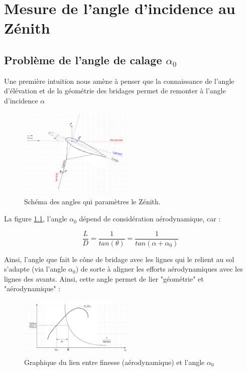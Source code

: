 \chapter{Mesure de l'angle d'incidence au Zénith}
\label{ch:Ch2}

\section{Problème de l'angle de calage $\alpha_0$} 
\label{sec:Ch2.1}

Une première intuition nous amène à penser que la connaissance de l'angle d'élévation et de la géométrie des bridages permet de remonter à l'angle d'incidence $\alpha$

\begin{figure}[H]
    \centering
    \includegraphics[width=0.5\textwidth]{Pics/02 - Mesure de l'angle d'incidence au Zénith/Schéma Equilibre Zéntih.png}  
    \caption{Schéma des angles qui paramètres le Zénith.}
    \label{fig:Zénith alpha zéro}
\end{figure}

La figure \ref{fig:Zénith alpha zéro}, l'angle $\alpha_0$ dépend de considération aérodynamique, car : 
\begin{center}
    \begin{equation}
        \frac{L}{D} = \frac{1}{tan(\theta)} = \frac{1}{tan(\alpha + \alpha_0)}
    \end{equation}
\end{center}
Ainsi, l'angle que fait le cône de bridage avec les lignes qui le relient au sol s'adapte (via l'angle $\alpha_0$) de sorte à aligner les efforts aérodynamiques avec les lignes des avants. Ainsi, cette angle permet de lier "géométrie" et "aérodynamique" :  

\begin{figure}[H]
    \centering
    \includegraphics[width=0.5\textwidth]{Pics/02 - Mesure de l'angle d'incidence au Zénith/Schéma Equilibre finesse.png}  
    \caption{Graphique du lien entre finesse (aérodynamique) et l'angle $\alpha_0$}
    \label{fig:Zénith finesse}
\end{figure}

